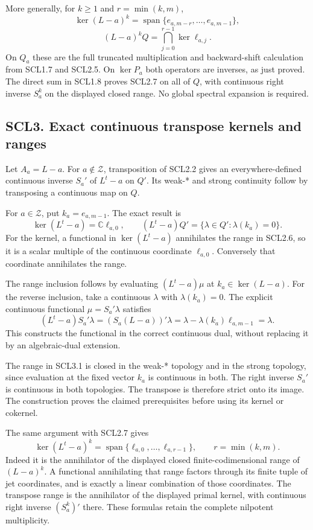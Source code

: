 More generally, for \(k\ge1\) and \(r=\min(k,m)\), \[
 \ker(L-a)^k
 =\operatorname{span}\{e_{a,m-r},\ldots,e_{a,m-1}\},
\] \[
 (L-a)^kQ
 =\bigcap_{j=0}^{r-1}\ker\ell_{a,j}.
 \tag{SCL2.7}
\] On \(Q_a\) these are the full truncated multiplication and
backward-shift calculation from SCL1.7 and SCL2.5. On \(\ker P_a\) both
operators are inverses, as just proved. The direct sum in SCL1.8 proves
SCL2.7 on all of \(Q\), with continuous right inverse \(S_a^k\) on the
displayed closed range. No global spectral expansion is required.

\subsection{SCL3. Exact continuous transpose kernels and
ranges}\label{scl3.-exact-continuous-transpose-kernels-and-ranges}

Let \(A_a=L-a\). For \(a\notin\mathscr Z\), transposition of SCL2.2
gives an everywhere-defined continuous inverse \(S_a'\) of \(L^t-a\) on
\(Q'\). Its weak-* and strong continuity follow by transposing a
continuous map on \(Q\).

For \(a\in\mathscr Z\), put \(k_a=e_{a,m-1}\). The exact result is \[
 \boxed{
 \ker(L^t-a)=\mathbb C\ell_{a,0},\qquad
 (L^t-a)Q'=\{\lambda\in Q':\lambda(k_a)=0\}.}
 \tag{SCL3.1}
\] For the kernel, a functional in \(\ker(L^t-a)\) annihilates the range
in SCL2.6, so it is a scalar multiple of the continuous coordinate
\(\ell_{a,0}\). Conversely that coordinate annihilates the range.

The range inclusion follows by evaluating \((L^t-a)\mu\) at
\(k_a\in\ker(L-a)\). For the reverse inclusion, take a continuous
\(\lambda\) with \(\lambda(k_a)=0\). The explicit continuous functional
\(\mu=S_a'\lambda\) satisfies \[
 (L^t-a)S_a'\lambda
 =(S_a(L-a))'\lambda
 =\lambda-\lambda(k_a)\ell_{a,m-1}
 =\lambda.
 \tag{SCL3.2}
\] This constructs the functional in the correct continuous dual,
without replacing it by an algebraic-dual extension.

The range in SCL3.1 is closed in the weak-* topology and in the strong
topology, since evaluation at the fixed vector \(k_a\) is continuous in
both. The right inverse \(S_a'\) is continuous in both topologies. The
transpose is therefore strict onto its image. The construction proves
the claimed prerequisites before using its kernel or cokernel.

The same argument with SCL2.7 gives \[
 \ker(L^t-a)^k
 =\operatorname{span}\{\ell_{a,0},\ldots,\ell_{a,r-1}\},
 \qquad r=\min(k,m).
 \tag{SCL3.3}
\] Indeed it is the annihilator of the displayed closed
finite-codimensional range of \((L-a)^k\). A functional annihilating
that range factors through its finite tuple of jet coordinates, and is
exactly a linear combination of those coordinates. The transpose range
is the annihilator of the displayed primal kernel, with continuous right
inverse \((S_a^k)'\) there. These formulas retain the complete nilpotent
multiplicity.

